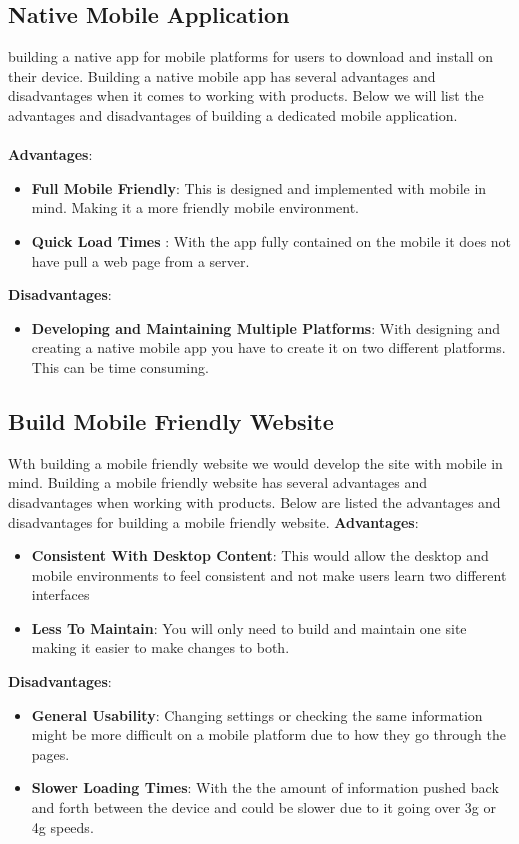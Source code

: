 \documentclass[onecolumn, draftclsnofoot,10pt, compsoc]{IEEEtran}
\begin{document}
		\subsection{Native Mobile Application}
		building a native app for mobile platforms for users
		to download and install on their device. Building a native mobile
		app has several advantages and disadvantages when it comes to working with
		products. Below we will list the advantages and disadvantages of building a
		dedicated mobile application.
		\\\\
		\textbf{Advantages}:
		\begin{itemize}
			\item \textbf{Full Mobile Friendly}: This is designed and implemented with
			mobile in mind. Making it a more friendly mobile environment.
			\item \textbf{Quick Load Times} : With the app fully contained on the mobile
			it does not have pull a web page from a server.
		\end{itemize}

		\textbf{Disadvantages}:
		\begin{itemize}
			\item \textbf{Developing and Maintaining Multiple Platforms}: With designing
			and creating a native mobile app you have to create it on two different platforms.
			This can be time consuming.
		\end{itemize}
		\subsection{Build Mobile Friendly Website}
		Wth building a mobile friendly website we would develop the site with mobile
		in mind. Building a mobile friendly website has several advantages and disadvantages
		when working with products. Below are listed the advantages and disadvantages
		for building a mobile friendly website.
		\textbf{Advantages}:
		\begin{itemize}
			\item \textbf{Consistent With Desktop Content}: This would allow the desktop
			and mobile environments to feel consistent and not make users learn two
			different interfaces
			\item \textbf{Less To Maintain}: You will only need to build and maintain
			one site making it easier to make changes to both.
		\end{itemize}
		\textbf{Disadvantages}:
		\begin{itemize}
			\item \textbf{General Usability}: Changing settings or checking the same
			information might be more difficult on a mobile platform due to how they go
			through the pages.
			\item \textbf{Slower Loading Times}: With the the amount of information pushed
			 back and forth between the device and could be slower due to it going over
			 3g or 4g speeds.
		\end{itemize}
\end{document}

